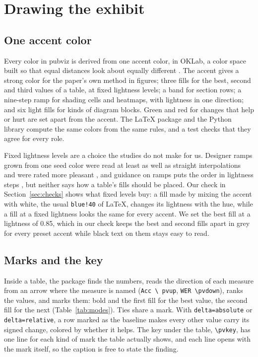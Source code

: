 \documentclass[11pt]{article}
\newcommand\code[1]{\texttt{#1}}
\begin{document}
\section{Drawing the exhibit}\label{sec:design}

\subsection{One accent color}

Every color in pubviz is derived from one accent color, in OKLab, a color
space built so that equal distances look about equally different
\citep{ottosson2020oklab}. The accent gives a strong color for the paper's
own method in figures; three fills for the best, second and third values of
a table, at fixed lightness levels; a band for section rows; a nine-step ramp
for shading cells and heatmaps, with lightness in one direction; and six
light fills for kinds of diagram blocks. Green and red for changes that help
or hurt are set apart from the accent. The LaTeX package and the Python
library compute the same colors from the same rules, and a test checks that
they agree for every role.

Fixed lightness levels are a choice the studies do not make for us.
Designer ramps grown from one seed color were read at least as well as
straight interpolations and were rated more pleasant
\citep[Sec.~4.1]{smart2020color}, and guidance on ramps puts the order in
lightness steps \citep[p.~29]{harrower2003colorbrewer}, but neither says how
a table's fills should be placed. Our check in Section~\ref{sec:checks} shows
what fixed levels buy: a fill made by mixing the accent with white, the usual
\code{blue!40} of LaTeX, changes its lightness with the hue, while a fill at a
fixed lightness looks the same for every accent. We set the best fill at a
lightness of 0.85, which in our check keeps the best and second fills apart
in grey for every preset accent while black text on them stays easy to read.

\subsection{Marks and the key}

Inside a table, the package finds the numbers, reads the direction of each
measure from an arrow where the measure is named (\code{Acc~\textbackslash
pvup}, \code{WER~\textbackslash pvdown}), ranks the values, and marks them:
bold and the first fill for the best value, the second fill for the next
(Table~\ref{tab:modes}). Ties share a mark. With \code{delta=absolute} or
\code{delta=relative}, a row marked as the baseline makes every other value
carry its signed change, colored by whether it helps. The
key under the table, \code{\textbackslash pvkey}, has one line for each kind
of mark the table actually shows, and each line opens with the mark itself,
so the caption is free to state the finding.
\end{document}
